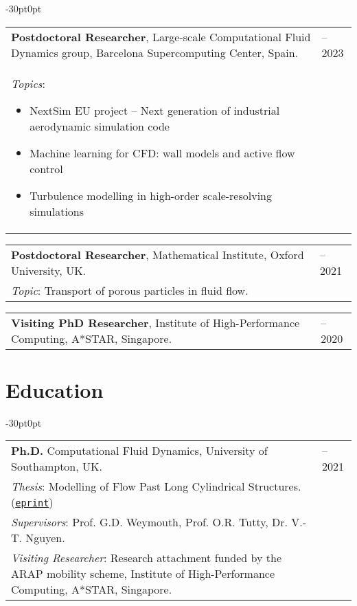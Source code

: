 \documentclass[line]{res}
\newenvironment{p1}
{\begin{adjustwidth}{-30pt}{0pt}
\vspace{8pt}}
{\end{adjustwidth}}
\begin{document}
\begin{resume}
\begin{p1}
\vspace{-5pt}
\begin{tabular}{p{} >{\raggedleft\arraybackslash}p{}}
	\textbf{Postdoctoral Researcher}, Large-scale Computational Fluid Dynamics group, Barcelona Supercomputing Center, Spain. & 2021--2023 \\
	\textit{Topics}:
	\begin{itemize}
		\item NextSim EU project -- Next generation of industrial aerodynamic simulation code
		\item Machine learning for CFD: wall models and active flow control
		\item Turbulence modelling in high-order scale-resolving simulations
	\end{itemize}
\end{tabular}

\vspace{-5pt}
\begin{tabular}{p{} >{\raggedleft\arraybackslash}p{}}
	\textbf{Postdoctoral Researcher}, Mathematical Institute, Oxford University, UK.& 2020--2021 \\
\textit{Topic}: Transport of porous particles in fluid flow. & \\
\end{tabular}

\vspace{5pt}
\begin{tabular}{p{} >{\raggedleft\arraybackslash}p{}}
	\textbf{Visiting PhD Researcher}, Institute of High-Performance Computing, A*STAR, Singapore. & 2017--2020 \\
\end{tabular}
\end{p1}

\section{Education}

\begin{p1}
\begin{tabular}{p{} >{\raggedleft\arraybackslash}p{}}
	\textbf{Ph.D.} Computational Fluid Dynamics, University of Southampton, UK. & 2015--2021 \\
	\textit{Thesis}: Modelling of Flow Past Long Cylindrical Structures. (\href{https://b-fg.github.io/assets/pdf/Font_2020_PhD_Modelling_of_Flow_Past_Long_Cylindrical_Structures.pdf}{\texttt{eprint}}) & \\
	\textit{Supervisors}: Prof. G.D. Weymouth, Prof. O.R. Tutty, Dr. V.-T. Nguyen. & \\
	\textit{Visiting Researcher}: Research attachment funded by the ARAP mobility scheme, Institute of High-Performance Computing, A*STAR, Singapore. & \\
\end{tabular}


\end{p1}
\end{resume}
\end{document}
